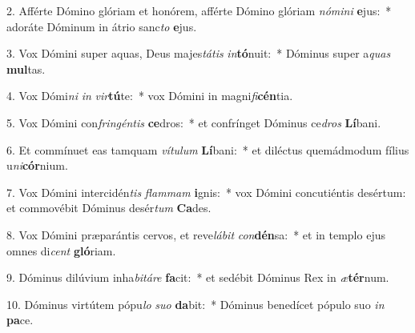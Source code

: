 2. Afférte Dómino glóriam et honórem, afférte Dómino glóriam \textit{nó}\textit{mi}\textit{ni} \textbf{e}jus:~*  adoráte Dóminum in átrio sanc\textit{to} \textbf{e}jus.\

3. Vox Dómini super aquas, Deus majes\textit{tá}\textit{tis} \textit{in}\textbf{tó}nuit:~*  Dóminus super a\textit{quas} \textbf{mul}tas.\

4. Vox Dómi\textit{ni} \textit{in} \textit{vir}\textbf{tú}te:~*  vox Dómini in magni\textit{fi}\textbf{cén}tia.\

5. Vox Dómini con\textit{frin}\textit{gén}\textit{tis} \textbf{ce}dros:~*  et confrínget Dóminus ce\textit{dros} \textbf{Lí}bani.\

6. Et commínuet eas tamquam \textit{ví}\textit{tu}\textit{lum} \textbf{Lí}bani:~*  et diléctus quemádmodum fílius u\textit{ni}\textbf{cór}nium.\

7. Vox Dómini intercidén\textit{tis} \textit{flam}\textit{mam} \textbf{i}gnis:~*  vox Dómini concutiéntis desértum: et commovébit Dóminus desér\textit{tum} \textbf{Ca}des.\

8. Vox Dómini præparántis cervos, et reve\textit{lá}\textit{bit} \textit{con}\textbf{dén}sa:~*  et in templo ejus omnes di\textit{cent} \textbf{gló}riam.\

9. Dóminus dilúvium inha\textit{bi}\textit{tá}\textit{re} \textbf{fa}cit:~*  et sedébit Dóminus Rex in \textit{æ}\textbf{tér}num.\

10. Dóminus virtútem pópu\textit{lo} \textit{su}\textit{o} \textbf{da}bit:~*  Dóminus benedícet pópulo suo \textit{in} \textbf{pa}ce.\

